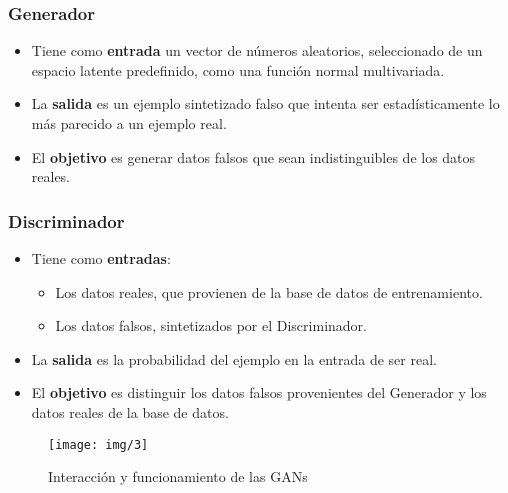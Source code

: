 \subsubsection{Generador}
\vspace{-0.4cm}
\begin{itemize}
    \item Tiene como \textbf{entrada} un vector de números aleatorios, seleccionado de un espacio latente predefinido, como una función normal
        multivariada.
    \item La \textbf{salida} es un ejemplo sintetizado falso que intenta ser estadísticamente lo más parecido a un ejemplo real.
    \item El \textbf{objetivo} es generar datos falsos que sean indistinguibles de los datos reales.
\end{itemize}

\vspace{-0.6cm}
\subsubsection{Discriminador}
\vspace{-0.4cm}
\begin{itemize}
    \item Tiene como \textbf{entradas}:
    \begin{itemize}
        \item Los datos reales, que provienen de la base de datos de entrenamiento.
        \item Los datos falsos, sintetizados por el Discriminador.
    \end{itemize}
    \item La \textbf{salida} es la probabilidad del ejemplo en la entrada de ser real.
    \item El \textbf{objetivo} es distinguir los datos falsos provenientes del Generador y los datos reales
        de la base de datos.
\end{itemize}

\begin{figure}[H]
    \texttt{[image: img/3]}
    \centering
    \caption{Interacción y funcionamiento de las GANs \cite{langrGANsActionDeep2019}}
    \label{3}
\end{figure}

